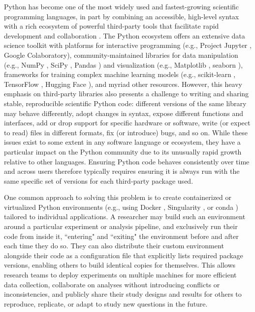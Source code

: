 \documentclass[preprint,12pt, a4paper]{elsarticle}
\begin{document}
Python \cite{vanR95} has become one of the most widely used and fastest-growing scientific programming languages, in part by combining an accessible, high-level syntax with a rich ecosystem of powerful third-party tools that facilitate rapid development and collaboration \cite{MullEtal15}.
The Python ecosystem offers an extensive data science toolkit with platforms for interactive programming (e.g., Project Jupyter \cite{KluyEtal16}, Google Colaboratory), community-maintained libraries for data manipulation (e.g., NumPy \cite{HarrEtal20}, SciPy \cite{VirtEtal20}, Pandas \cite{McKi10}) and visualization (e.g., Matplotlib \cite{Hunt07}, seaborn \cite{Wask21}), frameworks for training complex machine learning models (e.g., scikit-learn \cite{PedrEtal11}, TensorFlow \cite{AbadEtal15}, Hugging Face \cite{WolfEtal20}), and myriad other resources.
However, this heavy emphasis on third-party libraries also presents a challenge to writing and sharing stable, reproducible scientific Python code:
different versions of the same library may behave differently, adopt changes in syntax, expose different functions and interfaces, add or drop support for specific hardware or software, write (or expect to read) files in different formats, fix (or introduce) bugs, and so on.
While these issues exist to some extent in any software language or ecosystem, they have a particular impact on the Python community due to its unusually rapid growth relative to other languages.
Ensuring Python code behaves consistently over time and across users therefore typically requires ensuring it is always run with the same specific set of versions for each third-party package used.

One common approach to solving this problem is to create containerized or virtualized Python environments (e.g., using Docker \cite{Merk14}, Singularity \cite{KurtEtal17}, or conda \cite{Anac12}) tailored to individual applications.
A researcher may build such an environment around a particular experiment or analysis pipeline, and exclusively run their code from inside it, ``entering" and ``exiting" the environment before and after each time they do so.
They can also distribute their custom environment alongside their code as a configuration file that explicitly lists required package versions, enabling others to build identical copies for themselves.
This allows research teams to deploy experiments on multiple machines for more efficient data collection, collaborate on analyses without introducing conflicts or inconsistencies, and publicly share their study designs and results for others to reproduce, replicate, or adapt to study new questions in the future.
\end{document}
